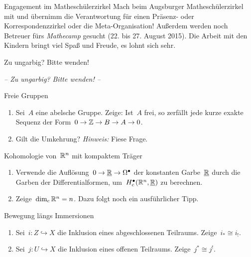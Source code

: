 \documentclass{uebblatt}
\begin{document}
\begin{aufgabe}{Engagement im Matheschülerzirkel}
Mach beim Augsburger Matheschülerzirkel mit und übernimm die Verantwortung für
einen Präsenz- oder Korrespondenzzirkel oder die Meta-Organisation!
Außerdem werden noch Betreuer fürs \emph{Mathecamp} gesucht (22. bis 27. August
2015). Die Arbeit mit den Kindern bringt viel Spaß und Freude, es lohnt sich sehr.
\end{aufgabe}

\ifxetex
  \begin{center}Zu ungarbig? Bitte wenden!
  \end{center}
\else
  \begin{center}\emph{-- Zu ungarbig? Bitte wenden! --}
  \end{center}
\fi

\newpage

\begin{aufgabe}{Freie Gruppen}
\begin{enumerate}
\item Sei~$A$ eine abelsche Gruppe. Zeige: Ist~$A$ frei, so zerfällt jede kurze
exakte Sequenz der Form~$0 \to \mathbb{Z} \to B \to A \to 0$.
\item Gilt die Umkehrung? {\tiny\emph{Hinweis:} Fiese Frage.}
\end{enumerate}
\end{aufgabe}

\begin{aufgabe}{Kohomologie von~$\mathbb{R}^n$ mit kompaktem Träger}
\begin{enumerate}
\item Verwende die Auflösung~$0 \to \underline{\mathbb{R}} \to \Omega^\bullet$ der konstanten
Garbe~$\underline{\mathbb{R}}$ durch die Garben der Differentialformen,
um~$H_c^\bullet(\mathbb{R}^n,\underline{\mathbb{R}})$ zu berechnen.
\item Zeige~$\dim_c \mathbb{R}^n = n$. {\tiny Dazu folgt noch ein ausführlicher Tipp.}
\end{enumerate}
\end{aufgabe}

\begin{aufgabe}{Bewegung längs Immersionen}
\begin{enumerate}
\item Sei~$i : Z \hookrightarrow X$ die Inklusion eines abgeschlossenen
Teilraums. Zeige~$i_* \cong i_!$.
\item Sei~$j : U \hookrightarrow X$ die Inklusion eines offenen Teilraums.
Zeige~$j^* \cong j^!$.
\end{enumerate}
\end{aufgabe}
\end{document}
